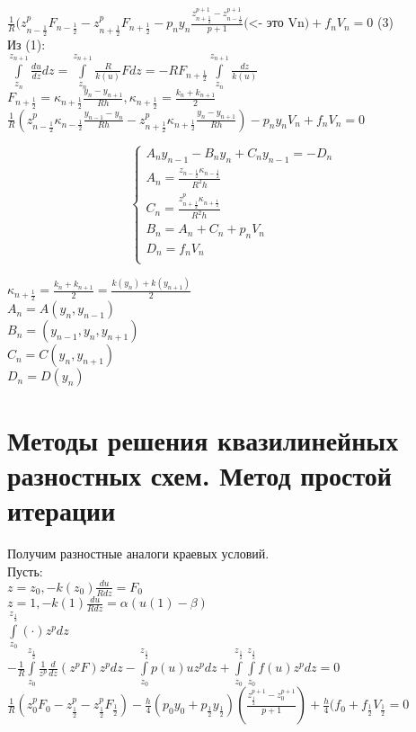 $\frac{1}{R} (z^p_{n-\frac{1}{2}} F_{n-\frac{1}{2}} - z^p_{n+\frac{1}{2}} F_{n+\frac{1}{2}} - p_n y_n \frac{z^{p+1}_{n+\frac{1}{2}} - z^{p+1}_{n-\frac{1}{2}}}{p + 1} \text{(<- это Vn)} + f_n V_n = 0$  (3)\\

Из (1):\\
$\int\limits_{z_n}^{z_{n+1}} \frac{du}{dz}dz = \int\limits_{z_n}^{z_{n+1}}\frac{R}{k(u)}F dz = -R F_{n+\frac{1}{2}} \int\limits_{z_n}^{z_{n+1}}\frac{dz}{k(u)}$\\
$F_{n+\frac{1}{2}} = \kappa_{n+\frac{1}{2}}\frac{y_n  - y_{n+1}}{R h}, \kappa_{n+\frac{1}{2}} = \frac{k_{n} + k_{n+1}}{2}$\\

$\frac{1}{R}(z^p_{n-\frac{1}{2}} \kappa_{n-\frac{1}{2}} \frac{y_{n-1} - y_n}{Rh} - z^p_{n+\frac{1}{2}} \kappa_{n+\frac{1}{2}} \frac{y_n - y_{n+1}}{Rh}) - p_n y_n V_n + f_n V_n = 0$ 

\begin{equation}
\begin{cases}
A_n y_{n-1} - B_n y_n+ C_n y_{n-1} = - D_n\\
A_n = \frac{z_{n-\frac{1}{2}} \kappa_{n-\frac{1}{2}}}{R^2 h}\\
C_n = \frac{z_{n+\frac{1}{2}}^p \kappa_{n+\frac{1}{2}}}{R^2 h}\\
B_n = A_n + C_n + p_n V_n\\
D_n = f_n V_n\\
\end{cases}
\end{equation}

$\kappa_{n+\frac{1}{2}} = \frac{k_n + k_{n+1}}{2} = \frac{k(y_n) + k(y_{n+1})}{2}$\\
$A_n = A(y_n, y_{n-1})$\\
$B_n = (y_{n-1}, y_n, y_{n+1})$\\
$C_n = C(y_n, y_{n+1})$\\
$D_n = D(y_n)$\\

\section{Методы решения квазилинейных разностных схем. Метод простой итерации}
Получим разностные аналоги краевых условий.\\
Пусть:\\
$z = z_0, -k(z_0)\frac{du}{R dz} = F_0$\\
$z = 1, -k(1) \frac{du}{R dz} = \alpha(u(1) - \beta)$\\
$\int\limits_{z_0}^{z_{\frac{1}{2}}}(\cdot)z^p dz$\\
$-\frac{1}{R}\int\limits_{z_0}^{z_{\frac{1}{2}}}\frac{1}{z^p} \frac{d}{dz} (z^p F) z^p dz - \int\limits_{z_0}^{z_{\frac{1}{2}}} p(u) u z^p dz + \int\limits_{z_0}^{z_{\frac{1}{2}}}\int\limits_{z_0}^{z_{\frac{1}{2}}} f(u) z^p dz = 0$\\
$\frac{1}{R} (z_0^p F_0 - z^p_{\frac{1}{2}} - z^p_{\frac{1}{2}} F_{\frac{1}{2}}) - \frac{h}{4}(p_0 y_0 + p_{\frac{1}{2}} y_{\frac{1}{2}})(\frac{z^{p+1}_{\frac{1}{2}} - z_0^{p+1}}{p+1}) + \frac{h}{4}(f_0 + f_{\frac{1}{2}} V_{\frac{1}{2}} = 0$\\

